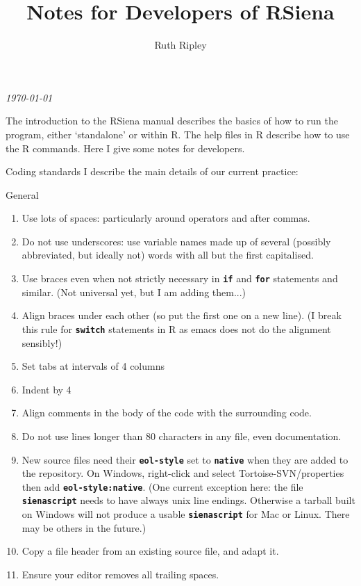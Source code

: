 \documentclass[12pt, a4paper]{article}
\makeatletter
\renewcommand{\=}{\,=\,}
\newcommand{\+}{\,+\,}
\newcommand{\sfn}[1]{\textbf{\texttt{#1}}}
\renewcommand{\section}{\@startsection{section}{1}
                {0pt}{\baselineskip}{0.5\baselineskip}
                {\centering\sffamily} }
\renewcommand{\subsection}{\@startsection{subsection}{2}
                {0pt}{0.7\baselineskip}{0.3\baselineskip}
                {\sffamily} }
\makeatother
\begin{document}
\title{Notes for Developers of RSiena}
\author{Ruth Ripley}
\date{}
\maketitle

\centerline{\emph{\today}}
\bigskip

The introduction to the RSiena manual describes the basics of how to run the
program, either `standalone' or within R. The help files in R describe how to
use the R commands. Here I give some notes for developers.
\section{Coding standards}
I describe the main details of our current practice:
\subsection{General}
\begin{enumerate}
\item Use lots of spaces: particularly around operators and after commas.
\item Do not use underscores: use variable names made up of several (possibly
  abbreviated, but ideally not) words with all but the first capitalised.
\item Use braces even when not strictly necessary in \sfn{if} and \sfn{for}
  statements and similar. (Not universal yet, but I am adding them...)
\item Align braces under each other (so put the first one on a new line). (I
  break this rule for \sfn{switch} statements in R as emacs does not do the
  alignment sensibly!)
\item Set tabs at intervals of 4 columns
\item Indent by 4
\item Align comments in the body of the code with the surrounding code.
\item Do not use lines longer than 80 characters in any file, even
  documentation.
\item New source files need their \sfn{eol-style} set to \sfn{native} when they
  are added to the repository. On Windows, right-click and select
  Tortoise-SVN/properties then add \sfn{eol-style:native}.  (One current
  exception here: the file \sfn{sienascript} needs to have always unix line
  endings. Otherwise a tarball built on Windows will not produce a usable
  \sfn{sienascript} for Mac or Linux. There may be others in the future.)
\item Copy a file header from an existing source file, and adapt it.
\item Ensure your editor removes all trailing spaces.
\end{enumerate}
\end{document}
